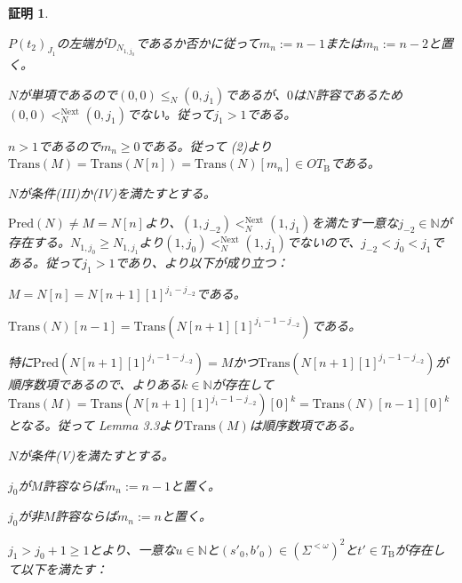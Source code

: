 \documentclass[dvipdfmx,uplatex]{jsarticle}
\theoremstyle{customnonumberbreakfortheorem}
\theoremstyle{customnonumberbreakforproof}
\newtheorem{hideableproof}{証明}
\begin{document}
\begin{hideableproof}
\begin{indented}
\begin{indented}
\begin{indented}
				\begin{indented}
					\item \(P(t_2)_{J_1}\)の左端が\(D_{N_{1,j_0}}\)であるか否かに従って\(m_n := n-1\)または\(m_n := n-2\)と置く。
					\item \(N\)が単項であるので\((0,0) \leq_N (0,j_1)\)であるが、\(0\)は\(N\)許容であるため\((0,0) <_N^{\textrm{Next}} (0,j_1)\)でない。従って\(j_1 > 1\)である。
					\item \(n > 1\)であるので\(m_n \geq 0\)である。従って (2)より\(\textrm{Trans}(M) = \textrm{Trans}(N[n]) = \textrm{Trans}(N)[m_n] \in OT_{\textrm{B}}\)である。
				\end{indented}
				\item
				\item \(N\)が条件(III)か(IV)を満たすとする。
				\begin{indented}
					\item \(\textrm{Pred}(N) \neq M = N[n]\)より、\((1,j_{-2}) <_N^{\textrm{Next}} (1,j_1)\)を満たす一意な\(j_{-2} \in \mathbb{N}\)が存在する。\(N_{1,j_0} \geq N_{1,j_1}\)より\((1,j_0) <_N^{\textrm{Next}} (1,j_1)\)でないので、\(j_{-2} < j_0 < j_1\)である。従って\(j_1 > 1\)であり、\nameref{条件(III)か(IV)の下での基本列の基本性質}より以下が成り立つ：
					\begin{penumerate}
						\item \(M = N[n] = N[n+1][1]^{j_1-j_{-2}}\)である。
						\item \(\textrm{Trans}(N)[n-1] = \textrm{Trans}(N[n+1][1]^{j_1-1-j_{-2}})\)である。
					\end{penumerate}
					\item 特に\(\textrm{Pred}(N[n+1][1]^{j_1-1-j_{-2}}) = M\)かつ\(\textrm{Trans}(N[n+1][1]^{j_1-1-j_{-2}})\)が順序数項であるので、よりある\(k \in \mathbb{N}\)が存在して\(\textrm{Trans}(M) = \textrm{Trans}(N[n+1][1]^{j_1-1-j_{-2}})[0]^k = \textrm{Trans}(N)[n-1][0]^k\)となる。従って\cite{buc1} Lemma 3.3より\(\textrm{Trans}(M)\)は順序数項である。
				\end{indented}
				\item
				\item \(N\)が条件(V)を満たすとする。
				\begin{indented}
					\item \(j_0\)が\(M\)許容ならば\(m_n := n-1\)と置く。
					\item \(j_0\)が非\(M\)許容ならば\(m_n := n\)と置く。
					\item \(j_1 > j_0+1 \geq 1\)とより、一意な\(u \in \mathbb{N}\)と\((s'_0,b'_0) \in (\Sigma^{< \omega})^2\)と\(t' \in T_{\textrm{B}}\)が存在して以下を満たす：

\end{indented}
\end{indented}
\end{indented}
\end{indented}
\end{hideableproof}
\end{document}
